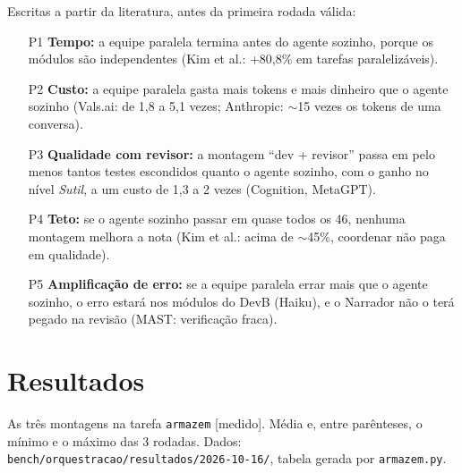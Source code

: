 \documentclass[11pt,a4paper]{article}
\newcommand{\rot}[1]{\textsf{\footnotesize[#1]}}
\begin{document}
Escritas a partir da literatura, antes da primeira rodada válida:
\begin{enumerate}
  \item[P1] \textbf{Tempo:} a equipe paralela termina antes do agente sozinho, porque os módulos são
    independentes (Kim et al.: +80,8\% em tarefas paralelizáveis).
  \item[P2] \textbf{Custo:} a equipe paralela gasta mais tokens e mais dinheiro que o agente sozinho
    (Vals.ai: de 1,8 a 5,1 vezes; Anthropic: ${\sim}$15 vezes os tokens de uma conversa).
  \item[P3] \textbf{Qualidade com revisor:} a montagem ``dev + revisor'' passa em pelo menos tantos testes
    escondidos quanto o agente sozinho, com o ganho no nível \emph{Sutil}, a um custo de 1,3 a 2
    vezes (Cognition, MetaGPT).
  \item[P4] \textbf{Teto:} se o agente sozinho passar em quase todos os 46, nenhuma montagem melhora a
    nota (Kim et al.: acima de ${\sim}$45\%, coordenar não paga em qualidade).
  \item[P5] \textbf{Amplificação de erro:} se a equipe paralela errar mais que o agente sozinho, o erro
    estará nos módulos do DevB (Haiku), e o Narrador não o terá pegado na revisão (MAST: verificação
    fraca).
\end{enumerate}

\section{Resultados}

\begin{table}[H]
\centering\small
\caption{As três montagens na tarefa \texttt{armazem} \rot{medido}. Média e, entre parênteses, o mínimo e
o máximo das 3 rodadas. Dados: \texttt{bench/orquestracao/resultados/2026-10-16/},
tabela gerada por \texttt{armazem.py}.}

\end{table}
\end{document}
